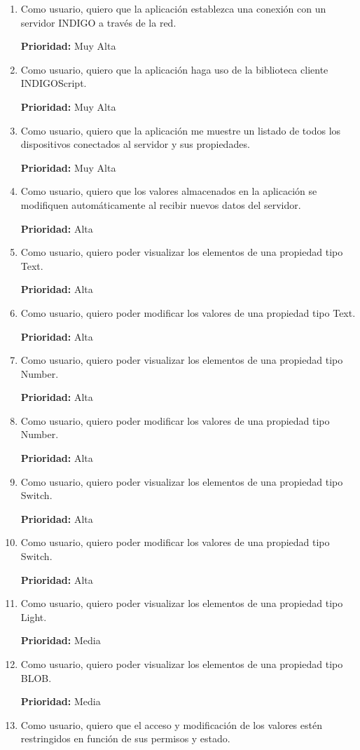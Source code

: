 \begin{enumerate}[label=\textbf{INDIGO.2.\arabic*}, leftmargin=10mm]
	\item Como usuario, quiero que la aplicación establezca una conexión con un servidor INDIGO a través de la red.
	
	\textbf{Prioridad:} Muy Alta
	\item Como usuario, quiero que la aplicación haga uso de la biblioteca cliente INDIGOScript.
	
	\textbf{Prioridad:} Muy Alta
	\item Como usuario, quiero que la aplicación me muestre un listado de todos los dispositivos conectados al servidor y sus propiedades.
	
	\textbf{Prioridad:} Muy Alta
	\item Como usuario, quiero que los valores almacenados en la aplicación se modifiquen automáticamente al recibir nuevos datos del servidor.
	
	\textbf{Prioridad:} Alta
	\item Como usuario, quiero poder visualizar los elementos de una propiedad tipo Text.
	
	\textbf{Prioridad:} Alta
	\item Como usuario, quiero poder modificar los valores de una propiedad tipo Text.
	
	\textbf{Prioridad:} Alta
	\item Como usuario, quiero poder visualizar los elementos de una propiedad tipo Number.
	
	\textbf{Prioridad:} Alta
	\item Como usuario, quiero poder modificar los valores de una propiedad tipo Number.
	
	\textbf{Prioridad:} Alta
	\item Como usuario, quiero poder visualizar los elementos de una propiedad tipo Switch.
	
	\textbf{Prioridad:} Alta
	\item Como usuario, quiero poder modificar los valores de una propiedad tipo Switch.
	
	\textbf{Prioridad:} Alta
	\item Como usuario, quiero poder visualizar los elementos de una propiedad tipo Light.
	
	\textbf{Prioridad:} Media
	\item Como usuario, quiero poder visualizar los elementos de una propiedad tipo BLOB.
	
	\textbf{Prioridad:} Media
	\item Como usuario, quiero que el acceso y modificación de los valores estén restringidos en función de sus permisos y estado.
	

\end{enumerate}

